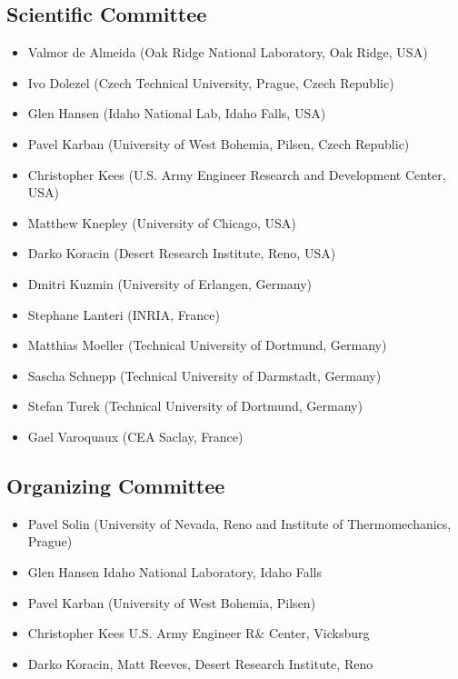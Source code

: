 \documentclass[article,A4,11pt]{llncs}%
\begin{document}
\subsection*{Scientific Committee}%


\begin{itemize}
\item Valmor de Almeida (Oak Ridge National Laboratory, Oak Ridge, USA)
\item Ivo Dolezel (Czech Technical University, Prague, Czech Republic)
\item Glen Hansen (Idaho National Lab, Idaho Falls, USA)
\item Pavel Karban (University of West Bohemia, Pilsen, Czech Republic)
\item Christopher Kees (U.S. Army Engineer Research and Development Center, USA)
\item Matthew Knepley (University of Chicago, USA)
\item Darko Koracin (Desert Research Institute, Reno, USA)
\item Dmitri Kuzmin (University of Erlangen, Germany)
\item Stephane Lanteri (INRIA, France)
\item Matthias Moeller (Technical University of Dortmund, Germany)
\item Sascha Schnepp (Technical University of Darmstadt, Germany)
\item Stefan Turek (Technical University of Dortmund, Germany)
\item Gael Varoquaux (CEA Saclay, France)
\end{itemize}

\subsection*{Organizing Committee}

\begin{itemize}
\item Pavel Solin (University of Nevada, Reno and Institute of Thermomechanics, Prague)
\item Glen Hansen Idaho National Laboratory, Idaho Falls
\item Pavel Karban  (University of West Bohemia, Pilsen)
\item Christopher Kees U.S. Army Engineer R\& Center, Vicksburg
\item Darko Koracin, Matt Reeves, Desert Research Institute, Reno
\end{itemize}
\end{document}

